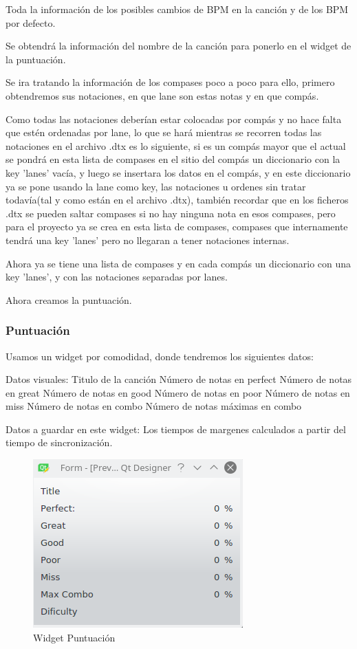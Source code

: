 \documentclass[a4paper,11pt,oneside]{book}
\begin{document}
Toda la información de los posibles cambios de BPM en la canción y de los BPM por defecto.

Se obtendrá la información del nombre de la canción para ponerlo en el widget de la puntuación.

Se ira tratando la información de los compases poco a poco para ello, primero obtendremos sus notaciones, en que lane son estas notas y en que compás.

Como todas las notaciones deberían estar colocadas por compás y no hace falta que estén ordenadas por lane, lo que se hará mientras se recorren todas las notaciones en el archivo .dtx es lo siguiente, si es un compás mayor que el actual se pondrá en esta lista de compases en el sitio del compás un diccionario con la key 'lanes' vacía, y luego se insertara los datos en el compás, y en este diccionario ya se pone usando la lane como key, las notaciones u ordenes sin tratar todavía(tal y como están en el archivo .dtx), también recordar que en los ficheros .dtx se pueden saltar compases si no hay ninguna nota en esos compases, pero para el proyecto ya se crea en esta lista de compases, compases que internamente tendrá una key 'lanes' pero no llegaran a tener notaciones internas.

Ahora ya se tiene una lista de compases y en cada compás un diccionario con una key 'lanes', y con las notaciones separadas por lanes.


Ahora creamos la puntuación.
\subsubsection{Puntuación}
Usamos un widget por comodidad, donde tendremos los siguientes datos:

Datos visuales:
Titulo de la canción
Número de notas en perfect
Número de notas en great
Número de notas en good
Número de notas en poor
Número de notas en miss
Número de notas en combo
Número de notas máximas en combo

Datos a guardar en este widget:
Los tiempos de margenes calculados a partir del tiempo de sincronización.

\begin{figure}[H]
\begin{center}
\includegraphics[scale=0.8]{Imagenes/WidgetPuntuacion.png}
\caption{Widget Puntuación}
\label{Widget Puntuación}
\end{center}
\end{figure}
\end{document}

